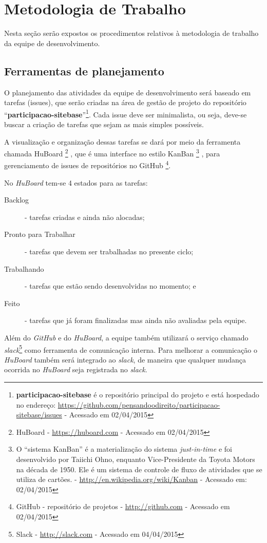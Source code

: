 \section{Metodologia de Trabalho\label{sec:metodologia-agil}}
Nesta seção serão expostos os procedimentos relativos à metodologia de trabalho da equipe de desenvolvimento.

\subsection{Ferramentas de planejamento}
O planejamento das atividades da equipe de desenvolvimento será baseado em tarefas (\glspl{issue}), que  serão criadas na área de gestão de projeto do repositório ``\textbf{participacao-sitebase}''\footnote{\textbf{participacao-sitebase} é o repositório principal do projeto e está hospedado no endereço: \url{https://github.com/pensandoodireito/participacao-sitebase/issues} - Acessado em 02/04/2015}. Cada \gls{issue} deve ser minimalista, ou seja, deve-se buscar a criação de tarefas que sejam as mais simples possíveis.

A visualização e organização dessas tarefas se dará por meio da ferramenta chamada HuBoard%
\footnote{HuBoard - \url{https://huboard.com} - Acessado em 02/04/2015}%
, que é uma interface no estilo KanBan%
\footnote{O ``sistema KanBan'' é a materialização do sistema \textit{just-in-time} e foi desenvolvido por Taiichi Ohno, enquanto Vice-Presidente da Toyota Motors na década de 1950. Ele é um sistema de controle de fluxo de atividades que se utiliza de cartões. - \url{http://en.wikipedia.org/wiki/Kanban} - Acessado em: 02/04/2015}
\cite{sugimori1977toyota},
para gerenciamento de \glspl{issue} de repositórios no GitHub%
\footnote{GitHub - repositório de projetos - \url{http://github.com} - Acessado em 02/04/2015}.

No \textit{HuBoard} tem-se 4 estados para as tarefas:
\begin{description}
\item[Backlog] - tarefas criadas e ainda não alocadas;
\item[Pronto para Trabalhar] - tarefas que devem ser trabalhadas no presente ciclo;
\item[Trabalhando] - tarefas que estão sendo desenvolvidas no momento; e
\item[Feito] - tarefas que já foram finalizadas mas ainda não avaliadas pela equipe.
\end{description}

Além do \textit{GitHub} e do \textit{HuBoard}, a equipe também utilizará o serviço chamado \textit{slack}\footnote{Slack - \url{http://slack.com} - Acessado em 04/04/2015} como ferramenta de comunicação interna. Para melhorar a comunicação o \textit{HuBoard} também será integrado ao \textit{slack}, de maneira que qualquer mudança ocorrida no \textit{HuBoard} seja registrada no \textit{slack}.

